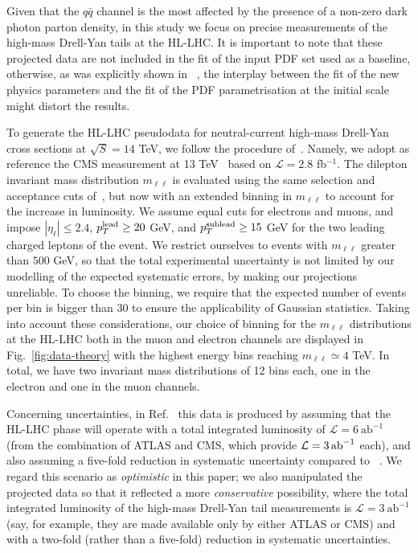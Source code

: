 \documentclass[withindex,glossary]{cam-thesis}
\begin{document}
Given that the $q\bar{q}$ channel is the most affected by the presence of a non-zero dark photon parton density, in this
study we focus on precise measurements of the high-mass Drell-Yan
tails at the HL-LHC. It is important to note that these projected data are not
included in the fit of the input PDF set used as a baseline,
otherwise, as was explicitly shown in ~\cite{Carrazza:2019sec,greljo_parton_2021,Iranipour:2022iak}, the interplay between the fit of the
new physics parameters and the fit of the PDF parametrisation at the
initial scale might distort the results. 

To generate the HL-LHC pseudodata for neutral-current
high-mass Drell-Yan cross sections at $\sqrt{S}=14$ TeV, we follow the procedure of~\cite{greljo_parton_2021}.
Namely, we adopt as reference the CMS  measurement at 13 TeV~\cite{CMS:2018mdl} based on $\mathcal{L}=2.8$ fb$^{-1}$.
%
The dilepton invariant mass distribution $m_{\ell\ell}$ is evaluated using the same selection
and acceptance cuts of~\cite{CMS:2018mdl}, but now with an extended
binning in $m_{\ell\ell}$ to account for the increase in luminosity.
%
We assume equal cuts for electrons and muons, and impose $|\eta_\ell|\le 2.4$,
$p_T^{\rm lead}\ge 20$ GeV, and $p_T^{\rm sublead}\ge 15$ GeV for the two
leading charged leptons of the event.
We restrict ourselves to  events with $m_{\ell\ell}$ greater than $500$ GeV, so that 
the total experimental uncertainty is not limited by our modelling
of the expected systematic errors, by making our projections unreliable.
%
To choose the binning, we require that the expected number of events per bin
is bigger than 30 to ensure the applicability of Gaussian statistics.
%
Taking into account these considerations, our choice of binning
for the $m_{\ell\ell}$ distributions at the HL-LHC both in the muon and electron channels 
are displayed in Fig.~\ref{fig:data-theory} with the highest energy bins reaching $m_{\ell\ell}\simeq 4 $ TeV.
In total, we have two invariant mass distributions of 12 bins each, one in the electron and one in the muon channels.

Concerning uncertainties, in Ref.~\cite{greljo_parton_2021} this data is produced by assuming that the HL-LHC phase will
operate with a total integrated luminosity of $\mathcal{L} = 6\ \text{ab}^{-1}$
(from the combination of ATLAS and CMS, which provide ${\cal L}=3 \,{\rm ab}^{-1}$ each),
and also assuming a five-fold reduction in systematic uncertainty
compared to ~\cite{CMS:2018mdl}. 
We regard this scenario as {\it optimistic} in this paper; we also
manipulated the projected data so that it reflected a more {\it
  conservative} possibility, where the total integrated luminosity of
the high-mass Drell-Yan tail measurements is $\mathcal{L} = 3\
\text{ab}^{-1}$ (say, for example, they are made available only by
either ATLAS or CMS) and with a two-fold (rather than a five-fold) reduction in systematic uncertainties.
\end{document}
